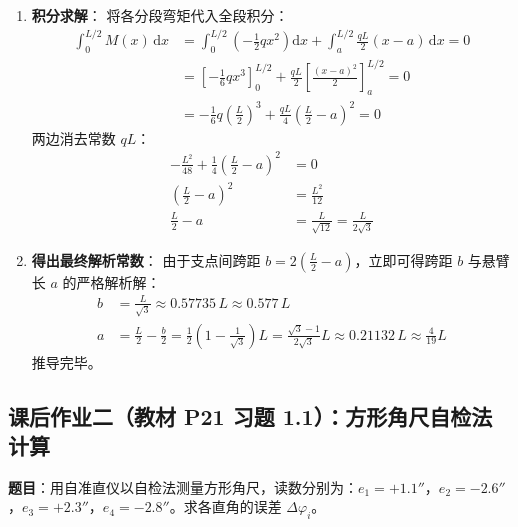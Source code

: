 \documentclass[11pt,a4paper]{ctexart}
\begin{document}
\begin{enumerate}[leftmargin=1.5em, itemsep=4pt]
    \item \textbf{积分求解}：
    将各分段弯矩代入全段积分：
    \begin{align*}
    \int_{0}^{L/2} M(x) \,\mathrm{d}x &= \int_{0}^{L/2} \left(-\frac{1}{2} q x^2\right) \mathrm{d}x + \int_{a}^{L/2} \frac{q L}{2}(x - a) \,\mathrm{d}x = 0 \\
    &= \left[ -\frac{1}{6} q x^3 \right]_{0}^{L/2} + \frac{q L}{2} \left[ \frac{(x - a)^2}{2} \right]_{a}^{L/2} = 0 \\
    &= -\frac{1}{6} q \left(\frac{L}{2}\right)^3 + \frac{q L}{4} \left(\frac{L}{2} - a\right)^2 = 0
    \end{align*}
    两边消去常数 $q L$：
    \begin{align*}
    -\frac{L^2}{48} + \frac{1}{4} \left(\frac{L}{2} - a\right)^2 &= 0 \\
    \left(\frac{L}{2} - a\right)^2 &= \frac{L^2}{12} \\
    \frac{L}{2} - a &= \frac{L}{\sqrt{12}} = \frac{L}{2\sqrt{3}}
    \end{align*}
    
    \item \textbf{得出最终解析常数}：
    由于支点间跨距 $b = 2\left(\frac{L}{2} - a\right)$，立即可得跨距 $b$ 与悬臂长 $a$ 的严格解析解：
    \begin{align}
    b &= \frac{L}{\sqrt{3}} \approx 0.57735\,L \approx 0.577\,L \\
    a &= \frac{L}{2} - \frac{b}{2} = \frac{1}{2}\left(1 - \frac{1}{\sqrt{3}}\right)L = \frac{\sqrt{3}-1}{2\sqrt{3}}L \approx 0.21132\,L \approx \frac{4}{19}L
    \end{align}
    推导完毕。
\end{enumerate}

\subsection{课后作业二（教材 P21 习题 1.1）：方形角尺自检法计算}
\noindent\textbf{题目}：用自准直仪以自检法测量方形角尺，读数分别为：$e_1 = +1.1''$，$e_2 = -2.6''$，$e_3 = +2.3''$，$e_4 = -2.8''$。求各直角的误差 $\Delta\varphi_i$。
\end{document}

